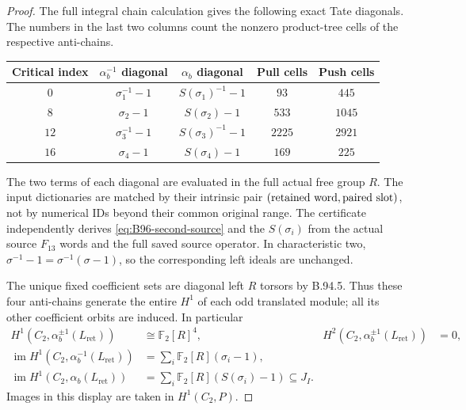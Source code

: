 \begin{proof}
The full integral chain calculation gives the following exact
Tate diagonals.  The numbers in the last two columns count the
nonzero product-tree cells of the respective anti-chains.
\begin{center}
\begin{tabular}{ccccc}
Critical index&$\alpha_b^{-1}$ diagonal&$\alpha_b$ diagonal&Pull cells&Push cells\\\hline
$0$&$\sigma_1^{-1}-1$&$S(\sigma_1)^{-1}-1$&$93$&$445$\\
$8$&$\sigma_2-1$&$S(\sigma_2)-1$&$533$&$1045$\\
$12$&$\sigma_3^{-1}-1$&$S(\sigma_3)^{-1}-1$&$2225$&$2921$\\
$16$&$\sigma_4-1$&$S(\sigma_4)-1$&$169$&$225$
\end{tabular}
\end{center}
The two terms of each diagonal are evaluated in the full actual
free group $R$.  The input dictionaries are matched by their
intrinsic pair $(\hbox{retained word},\hbox{paired slot})$, not
by numerical IDs beyond their common original range.  The
certificate independently derives \eqref{eq:B96-second-source}
and the $S(\sigma_i)$ from the actual source $F_{13}$ words and
the full saved source operator.  In characteristic two,
$\sigma^{-1}-1=\sigma^{-1}(\sigma-1)$, so the corresponding
left ideals are unchanged.

The unique fixed coefficient sets are diagonal left $R$ torsors
by B.94.5.  Thus these four anti-chains generate the entire
$H^1$ of each odd translated module; all its other coefficient
orbits are induced.  In particular
\begin{equation}\label{eq:B96-odd-images}
 \begin{aligned}
 H^1(C_2,\alpha_b^{\pm1}(L_{\mathrm{ret}}))
       &\cong\mathbb F_2[R]^4,
       &H^2(C_2,\alpha_b^{\pm1}(L_{\mathrm{ret}}))&=0,\\
 \operatorname{im}H^1(C_2,\alpha_b^{-1}(L_{\mathrm{ret}}))
       &=\sum_i\mathbb F_2[R](\sigma_i-1),\\
 \operatorname{im}H^1(C_2,\alpha_b(L_{\mathrm{ret}}))
       &=\sum_i\mathbb F_2[R](S(\sigma_i)-1)\subseteq J_I.
 \end{aligned}
\end{equation}
Images in this display are taken in $H^1(C_2,P)$.


\end{proof}
